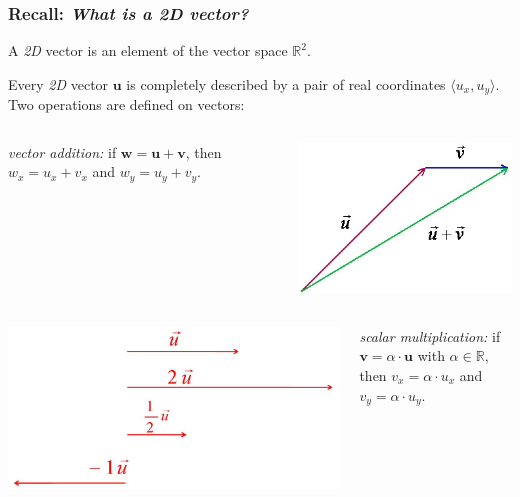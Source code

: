 \documentclass[english,serif,mathserif,xcolor=pdftex,dvipsnames,table]{beamer}
\begin{document}
\begin{frame}
  \frametitle{Recall: \emph{What is a 2D vector?}}

  A \emph{2D} vector is an element of the vector space
  $\mathbb{R}^2$.

  \+
  Every \emph{2D} vector $\mathbf{u}$ is completely described by a
  pair of real coordinates $\langle u_x, u_y \rangle$.
  Two operations are defined on vectors:

  \+
  \begin{columns}
    \begin{column}{0.6\linewidth}
      \raggedleft
      \emph{vector addition:} if $\mathbf{w} = \mathbf{u} +
        \mathbf{v}$, then $w_x = u_x + v_x$ and $w_y = u_y + v_y$.
    \end{column}
    \begin{column}{0.4\linewidth}
      \centering
      \includegraphics[height=4\baselineskip]{fig/VectorAddition.jpg}
    \end{column}
  \end{columns}

  \+
  \begin{columns}
    \begin{column}{0.4\linewidth}
      \centering
      \includegraphics[height=3\baselineskip]{fig/VectorScalarMultiplication.jpg}
    \end{column}
    \begin{column}{0.6\linewidth}
      \raggedright
      \emph{scalar multiplication:} if $\mathbf{v} = \alpha
      \cdot \mathbf{u}$ with $\alpha \in \mathbb{R}$, then $v_x =
      \alpha \cdot u_x$ and $v_y = \alpha \cdot u_y$.
    \end{column}
  \end{columns}


\end{frame}
\end{document}
